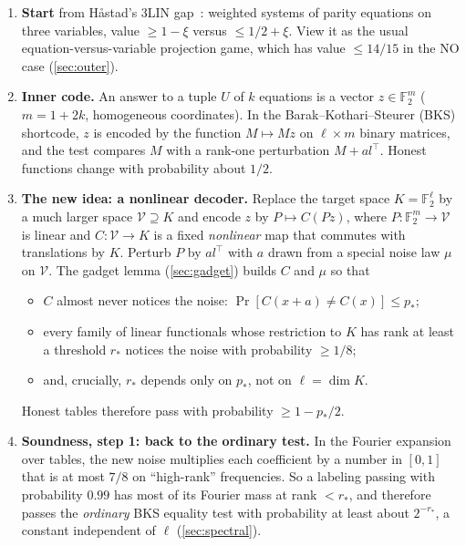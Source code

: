 \documentclass[11pt]{article}
\theoremstyle{definition}
\theoremstyle{remark}
\newcommand{\F}{\mathbb F}
\newcommand{\V}{\mathcal V}
\begin{document}
\begin{enumerate}[leftmargin=*]
\item \textbf{Start} from H{\aa}stad's 3LIN gap~\cite{Hastad01}: weighted
  systems of parity equations on three variables, value $\ge1-\xi$ versus
  $\le1/2+\xi$. View it as the usual equation-versus-variable projection
  game, which has value $\le14/15$ in the NO case (\cref{sec:outer}).

\item \textbf{Inner code.} An answer to a tuple $U$ of $k$ equations is a
  vector $z\in\F_2^m$ ($m=1+2k$, homogeneous coordinates). In the
  Barak--Kothari--Steurer (BKS) shortcode, $z$ is encoded by the function
  $M\mapsto Mz$ on $\ell\times m$ binary matrices, and the test compares $M$
  with a rank-one perturbation $M+al^\top$. Honest functions change with
  probability about $1/2$.

\item \textbf{The new idea: a nonlinear decoder.} Replace the target space
  $K=\F_2^\ell$ by a much larger space $\V\supseteq K$ and encode $z$ by
  $P\mapsto C(Pz)$, where $P\colon\F_2^m\to\V$ is linear and
  $C\colon\V\to K$ is a fixed \emph{nonlinear} map that commutes with
  translations by $K$. Perturb $P$ by $al^\top$ with $a$ drawn from a special
  noise law $\mu$ on $\V$. The gadget lemma (\cref{sec:gadget}) builds $C$
  and $\mu$ so that
  \begin{itemize}
  \item $C$ almost never notices the noise: $\Pr[C(x+a)\ne C(x)]\le p_*$;
  \item every family of linear functionals whose restriction to $K$ has rank
    at least a threshold $r_*$ notices the noise with probability $\ge1/8$;
  \item and, crucially, $r_*$ depends only on $p_*$, not on $\ell=\dim K$.
  \end{itemize}
  Honest tables therefore pass with probability $\ge1-p_*/2$.

\item \textbf{Soundness, step 1: back to the ordinary test.} In the Fourier
  expansion over tables, the new noise multiplies each coefficient by a number
  in $[0,1]$ that is at most $7/8$ on ``high-rank'' frequencies. So a labeling
  passing with probability $0.99$ has most of its Fourier mass at rank
  $<r_*$, and therefore passes the \emph{ordinary} BKS equality test with
  probability at least about $2^{-r_*}$, a constant independent of $\ell$
  (\cref{sec:spectral}).


\end{enumerate}
\end{document}
